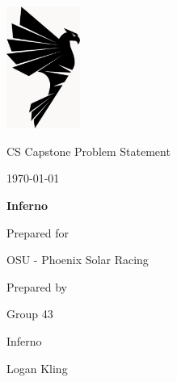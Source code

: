 \documentclass[onecolumn, draftclsnofoot,10pt, compsoc]{IEEEtran}
\def \CapstoneTeamName{		Inferno}
\def \CapstoneTeamNumber{		43}
\def \GroupMemberOne{			Dennie Devito}
\def \GroupMemberTwo{			Logan Kling}
\def \GroupMemberThree{			Dakota Zaengle}
\def \CapstoneProjectName{		Inferno}
\def \CapstoneSponsorCompany{	OSU - Phoenix Solar Racing}
\def \CapstoneSponsorPerson{		Cailin Moore}
\def \DocType{		Problem Statement
				}
\newcommand{\NameSigPair}[1]{\par
\makebox[2.75in][r]{#1} \hfil 	\makebox[3.25in]{\makebox[2.25in]{\hrulefill} \hfill		\makebox[.75in]{\hrulefill}}
\par\vspace{-12pt} \textit{\tiny\noindent
\makebox[2.75in]{} \hfil		\makebox[3.25in]{\makebox[2.25in][r]{Signature} \hfill	\makebox[.75in][r]{Date}}}}
\begin{document}
\begin{singlespace}
\begin{titlepage}
    	\includegraphics[height=4cm]{Shirt_Graphic}
        \hfill 
        \par\vspace{.2in}
        \centering
        \scshape{
            \huge CS Capstone \DocType \par
            {\large\today}\par
            \vspace{.5in}
            \textbf{\Huge\CapstoneProjectName}\par
            \vfill
            {\large Prepared for}\par
            \Huge \CapstoneSponsorCompany\par
            \vspace{5pt}
            {\large Prepared by }\par
            Group\CapstoneTeamNumber\par
            \CapstoneTeamName\par 
            \vspace{5pt}
            {\Large
                Logan Kling%
            }
            \vspace{20pt}
        }
        \begin{abstract}

\end{abstract}
\end{titlepage}
\end{singlespace}
\end{document}
